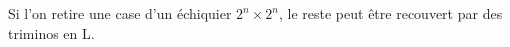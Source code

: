 Si l'on retire une case d'un échiquier $2^n \times 2^n$, le reste peut être recouvert par des triminos en L.
